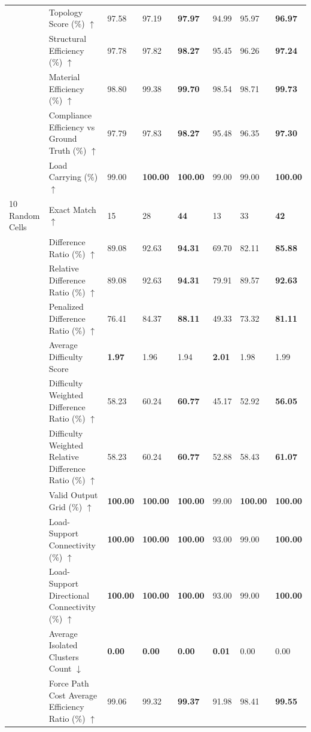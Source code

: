 \begin{table}[!h]
{\begin{tabular}{lllll|lll}
 & Topology Score (\%) $\uparrow$ & 97.58 & 97.19 & \textbf{97.97} & 94.99 & 95.97 & \textbf{96.97} \\
 & Structural Efficiency (\%) $\uparrow$ & 97.78 & 97.82 & \textbf{98.27} & 95.45 & 96.26 & \textbf{97.24} \\
 & Material Efficiency (\%) $\uparrow$ & 98.80 & 99.38 & \textbf{99.70} & 98.54 & 98.71 & \textbf{99.73} \\
 & Compliance Efficiency vs Ground Truth (\%) $\uparrow$ & 97.79 & 97.83 & \textbf{98.27} & 95.48 & 96.35 & \textbf{97.30} \\
 & Load Carrying (\%) $\uparrow$ & 99.00 & \textbf{100.00} & \textbf{100.00} & 99.00 & 99.00 & \textbf{100.00} \\
\midrule
10 Random Cells & Exact Match $\uparrow$ & 15 & 28 & \textbf{44} & 13 & 33 & \textbf{42} \\
 & Difference Ratio (\%) $\uparrow$ & 89.08 & 92.63 & \textbf{94.31} & 69.70 & 82.11 & \textbf{85.88} \\
 & Relative Difference Ratio (\%) $\uparrow$ & 89.08 & 92.63 & \textbf{94.31} & 79.91 & 89.57 & \textbf{92.63} \\
 & Penalized Difference Ratio (\%) $\uparrow$ & 76.41 & 84.37 & \textbf{88.11} & 49.33 & 73.32 & \textbf{81.11} \\
 & Average Difficulty Score & \textbf{1.97} & 1.96 & 1.94 & \textbf{2.01} & 1.98 & 1.99 \\
 & Difficulty Weighted Difference Ratio (\%) $\uparrow$ & 58.23 & 60.24 & \textbf{60.77} & 45.17 & 52.92 & \textbf{56.05} \\
 & Difficulty Weighted Relative Difference Ratio (\%) $\uparrow$ & 58.23 & 60.24 & \textbf{60.77} & 52.88 & 58.43 & \textbf{61.07} \\
 & Valid Output Grid (\%) $\uparrow$ & \textbf{100.00} & \textbf{100.00} & \textbf{100.00} & 99.00 & \textbf{100.00} & \textbf{100.00} \\
 & Load-Support Connectivity (\%) $\uparrow$ & \textbf{100.00} & \textbf{100.00} & \textbf{100.00} & 93.00 & 99.00 & \textbf{100.00} \\
 & Load-Support Directional Connectivity (\%) $\uparrow$ & \textbf{100.00} & \textbf{100.00} & \textbf{100.00} & 93.00 & 99.00 & \textbf{100.00} \\
 & Average Isolated Clusters Count $\downarrow$ & \textbf{0.00} & \textbf{0.00} & \textbf{0.00} & \textbf{0.01} & 0.00 & 0.00 \\
 & Force Path Cost Average Efficiency Ratio (\%) $\uparrow$ & 99.06 & 99.32 & \textbf{99.37} & 91.98 & 98.41 & \textbf{99.55} \\

\end{tabular}}
\end{table}
